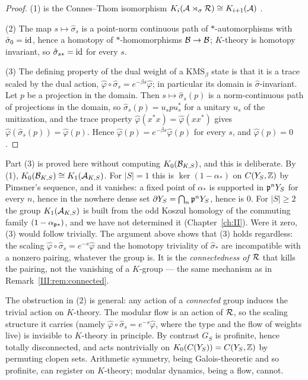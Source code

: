 \begin{proof}
(1) is the Connes--Thom isomorphism $K_i(\mathcal{A}\rtimes_\sigma\mathcal{R})\cong K_{i+1}(\mathcal{A})$ \cite{ConnesThom}.

(2) The map $s\mapsto\hat\sigma_s$ is a point-norm continuous path of $*$-automorphisms with
$\hat\sigma_0=\mathrm{id}$, hence a homotopy of $*$-homomorphisms $\mathcal{B}\to\mathcal{B}$; $K$-theory is homotopy
invariant, so $\hat\sigma_{s*}=\mathrm{id}$ for every $s$.

(3) The defining property of the dual weight of a $\mathrm{KMS}_\beta$ state is that it is a
trace scaled by the dual action, $\hat\varphi\circ\hat\sigma_s=e^{-\beta s}\hat\varphi$;
in particular its domain is $\hat\sigma$-invariant. Let $p$ be a projection in the domain.
Then $s\mapsto\hat\sigma_s(p)$ is a norm-continuous path of projections in the domain, so
$\hat\sigma_s(p)=u_spu_s^*$ for a unitary $u_s$ of the unitization, and the trace property
$\hat\varphi(x^*x)=\hat\varphi(xx^*)$ gives $\hat\varphi(\hat\sigma_s(p))=\hat\varphi(p)$. Hence
$\hat\varphi(p)=e^{-\beta s}\hat\varphi(p)$ for every $s$, and $\hat\varphi(p)=0$.
\end{proof}

\begin{remark}\label{III:rem:twomech}
Part (3) is proved here without computing $K_0(\mathcal{B}_{K,S})$, and this is deliberate. By (1),
$K_0(\mathcal{B}_{K,S})\cong K_1(\mathcal{A}_{K,S})$. For $|S|=1$ this is $\ker(1-\alpha_*)$ on $C(Y_S,\mathbb{Z})$
by Pimsner's sequence, and it vanishes: a fixed point of $\alpha_*$ is supported in
$\mathfrak{p}^nY_S$ for every $n$, hence in the nowhere dense set $\partial Y_S=\bigcap_n\mathfrak{p}^nY_S$,
hence is $0$. For $|S|\ge2$ the group $K_1(\mathcal{A}_{K,S})$ is built from the odd Koszul homology
of the commuting family $(1-\alpha_{\mathfrak{p}*})$, and we have not determined it (Chapter~\ref{ch:II}). Were
it zero, (3) would follow trivially. The argument above shows that (3) holds regardless: the
scaling $\hat\varphi\circ\hat\sigma_s=e^{-s}\hat\varphi$ and the homotopy triviality of
$\hat\sigma_*$ are incompatible with a nonzero pairing, whatever the group is. It is the
\emph{connectedness of $\mathcal{R}$} that kills the pairing, not the vanishing of a $K$-group ---
the same mechanism as in Remark~\ref{III:rem:connected}.
\end{remark}

\begin{remark}\label{III:rem:connected}
The obstruction in (2) is general: any action of a \emph{connected} group induces the
trivial action on $K$-theory. The modular flow is an action of $\mathcal{R}$, so the scaling
structure it carries (namely $\hat\varphi\circ\hat\sigma_s=e^{-s}\hat\varphi$, where the type
and the flow of weights live) is invisible to $K$-theory in principle. By contrast $G_S$ is
profinite, hence totally disconnected, and acts nontrivially on $K_0(C(Y_S))=C(Y_S,\mathbb{Z})$ by
permuting clopen sets. Arithmetic symmetry, being Galois-theoretic and so profinite, can
register on $K$-theory; modular dynamics, being a flow, cannot.
\end{remark}

